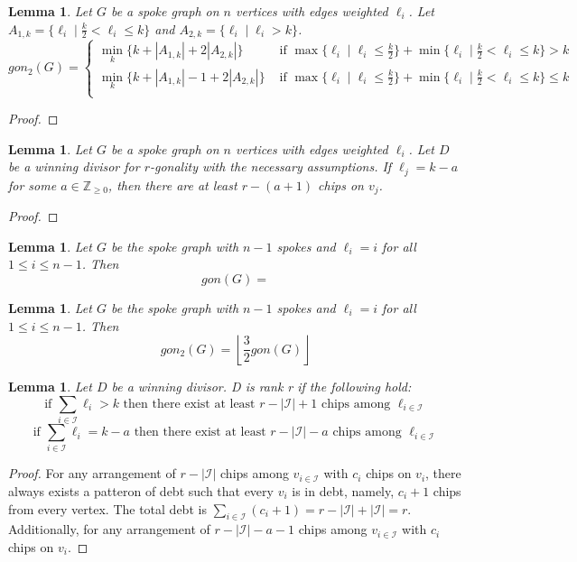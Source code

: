 \documentclass{article}
\newtheorem{lemma}[theorem]{Lemma}
\newcommand{\I}{\mathcal{I}}
\theoremstyle{definition}
\begin{document}
\begin{lemma}
    Let $G$ be a spoke graph on $n$ vertices with edges weighted $\ell_i$. Let $A_{1,k} = \{\ell_i \mid \frac{k}{2}<\ell_i\leq k \}$ and $A_{2,k} = \{ \ell_i \mid \ell_i>k \}$.  
    $$gon_2(G) =\begin{cases}
         \min_{k}\{k + |A_{1,k}| +2|A_{2,k}|\} & \text{ if } \max\{\ell_i \mid \ell_i \leq \frac{k}{2}\} +\min\{ \ell_i \mid \frac{k}{2}<\ell_i\leq k \}>k \\
         \min_{k}\{k + |A_{1,k}|-1 +2|A_{2,k}|\} & \text{ if } \max\{\ell_i \mid \ell_i \leq \frac{k}{2}\} +\min\{ \ell_i \mid \frac{k}{2}<\ell_i\leq k \}\leq k \\
    \end{cases}$$
\end{lemma}
\begin{proof}
    
\end{proof}

\begin{lemma}
    Let $G$ be a spoke graph on $n$ vertices with edges weighted $\ell_i$. Let $D$ be a winning divisor for $r$-gonality with the necessary assumptions. If $\ell_j=k-a$ for some $a\in \mathbb{Z}_{\geq 0}$, then there are at least $r-(a+1)$ chips on $v_j$.
\end{lemma}
\begin{proof}
    
\end{proof}

\begin{lemma}
    Let $G$ be the spoke graph with $n-1$ spokes and $\ell_i = i$ for all $1\leq i \leq n-1$. Then
    $$gon(G) = $$
\end{lemma}

\begin{lemma}
    Let $G$ be the spoke graph with $n-1$ spokes and $\ell_i = i$ for all $1\leq i \leq n-1$. Then
    $$gon_2(G) = \left\lfloor \frac{3}{2} gon(G) \right\rfloor$$
\end{lemma}

\begin{lemma}
    Let $D$ be a winning divisor. D is rank r if the following hold:
    \[ \text{if } \sum_{i\in\I} \ell_i > k \text{ then there exist at least } r - |\I| + 1 \text{ chips among } \ell_{i\in\I} \] 
    \[ \text{if } \sum_{i\in\I} \ell_i = k - a \text{ then there exist at least } r - |\I| - a \text{ chips among } \ell_{i\in\I} \] 
\end{lemma}
\begin{proof}
    For any arrangement of $r - |\I|$ chips among $v_{i\in\I}$ with $c_i$ chips on $v_i$, 
    there always exists a patteron of debt such that every $v_i$ is in debt, namely, $c_i + 1$ chips from every vertex.
    The total debt is $\sum_{i\in\I} {(c_i + 1)} = r - |\I| + |\I| = r$. \\
    Additionally, for any arrangement of $r - |\I| - a - 1$ chips among $v_{i\in\I}$ with $c_i$ chips on $v_i$. 
\end{proof}
\end{document}
